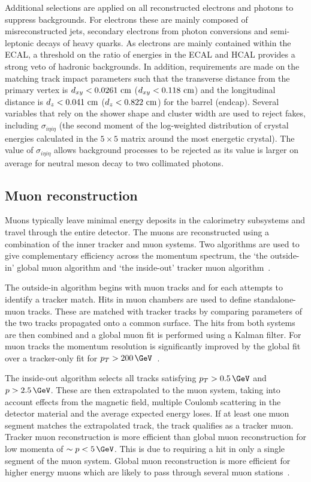 Additional selections are applied on all reconstructed electrons and photons to suppress backgrounds.
For electrons these are mainly composed of misreconstructed jets, secondary electrons from photon
conversions and semi-leptonic decays of heavy quarks. As electrons are mainly contained within 
the ECAL, a threshold on the ratio of energies in the ECAL and HCAL provides a strong veto of hadronic
backgrounds. In addition, requirements are made on the matching track impact
parameters such that the transverse distance from the primary vertex is $d_{xy} < 0.0261\,\,\text{cm}$ ($d_{xy} < 0.118\,\,\text{cm}$) 
and the longitudinal distance is $d_z < 0.041\,\,\text{cm}$ ($d_z < 0.822\,\,\text{cm}$) for the barrel (endcap). 
Several variables that rely on the shower shape and cluster width are used to
reject fakes, including $\sigma_{i\eta i\eta}$ (the second moment of the log-weighted
distribution of crystal energies calculated in the $5\times5$ matrix around the
most energetic crystal). The value of $\sigma_{i\eta i\eta}$ allows background
processes to be rejected as its value is larger on average for neutral meson decay to two collimated photons.

\subsection{Muon reconstruction}
\label{sec:muon_reco}

Muons typically leave minimal energy deposits in the calorimetry
subsystems and travel through the entire detector. The muons are reconstructed using a 
combination of the inner tracker and muon systems. Two algorithms are used to 
give complementary efficiency across the momentum spectrum, the `the outside-in' 
global muon algorithm and `the inside-out' tracker muon algorithm~\cite{muon_reco}.

The outside-in algorithm begins with muon tracks and for each attempts to
identify a tracker match. Hits in muon chambers are used to define standalone-muon tracks. 
These are matched with tracker tracks by comparing parameters of the two tracks propagated 
onto a common surface. The hits from both systems are then combined and a global muon fit 
is performed using a Kalman filter. For muon tracks the momentum resolution is significantly improved by 
the global fit over a tracker-only fit for $p_T > 200\,\GeV$~\cite{CMS,muon_reco_cosmic}. 

The inside-out algorithm selects all tracks satisfying $p_T > 0.5\,\GeV$ and $p > 2.5\,\GeV$. These are then 
extrapolated to the muon system, taking into account effects from the magnetic field, multiple Coulomb scattering
in the detector material and the average expected energy loses. If at least one muon segment matches 
the extrapolated track, the track qualifies as a tracker muon. Tracker muon reconstruction is more efficient
than global muon reconstruction for low momenta of $\sim p< 5\,\GeV$. This is due
to requiring a hit in only a single segment of the muon system. Global muon reconstruction is 
more efficient for higher energy muons which are likely to pass through several muon stations~\cite{muon_reco}.

